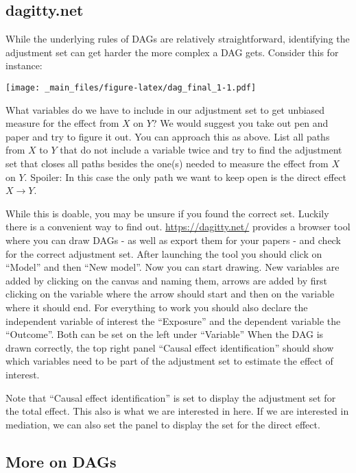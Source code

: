 \documentclass[
]{book}
\begin{document}
\hypertarget{dagitty.net}{%
\subsection{dagitty.net}\label{dagitty.net}}

While the underlying rules of DAGs are relatively straightforward, identifying
the adjustment set can get harder the more complex a DAG gets. Consider this for
instance:

\texttt{[image: \_main\_files/figure-latex/dag\_final\_1-1.pdf]}

What variables do we have to include in our adjustment set to get unbiased
measure for the effect from \(X\) on \(Y\)? We would suggest you take out pen and paper
and try to figure it out. You can approach this as above. List all paths from
\(X\) to \(Y\) that do not include a variable twice and try to find the adjustment
set that closes all paths besides the one(s) needed to measure the effect from
\(X\) on \(Y\). Spoiler: In this case the only path we want to keep open is the
direct effect \(X \rightarrow Y\).

While this is doable, you may be unsure if you found the correct set. Luckily there
is a convenient way to find out. \url{https://dagitty.net/} provides a browser tool
where you can draw DAGs - as well as export them for your papers - and check for
the correct adjustment set. After launching the tool you should click on ``Model''
and then ``New model''. Now you can start drawing. New variables are added by
clicking on the canvas and naming them, arrows are added by first clicking on
the variable where the arrow should start and then on the variable where it
should end. For everything to work you should also declare the independent
variable of interest the ``Exposure'' and the dependent variable the ``Outcome''.
Both can be set on the left under ``Variable'' When the DAG is drawn correctly,
the top right panel ``Causal effect identification'' should show which variables
need to be part of the adjustment set to estimate the effect of interest.

Note that ``Causal effect identification'' is set to display the adjustment set
for the total effect. This also is what we are interested in here. If we are
interested in mediation, we can also set the panel to display the set for the
direct effect.

\hypertarget{more-on-dags}{%
\subsection{More on DAGs}\label{more-on-dags}}
\end{document}
